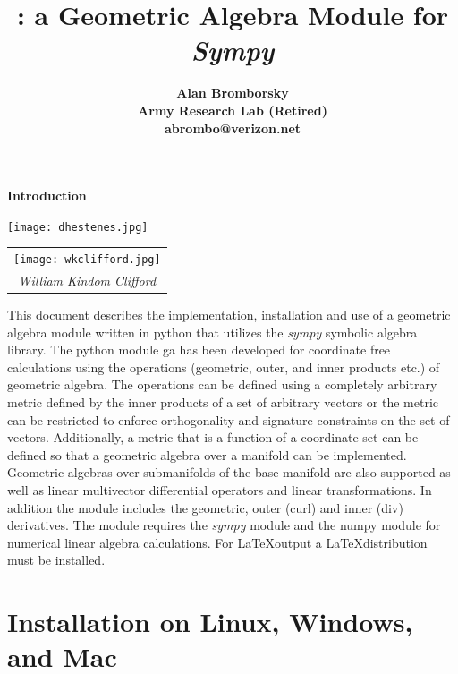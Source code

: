 \documentclass[12pt]{report}
\title{\galgebra: \bf\Large a Geometric Algebra Module for \emph{Sympy}}
\author{\bf Alan Bromborsky\\
\bf Army Research Lab (Retired)\\
\bf abrombo@verizon.net}
\begin{document}
\parskip 10pt

\maketitle
{\bf Introduction}\newline

\begin{center}
\texttt{[image: dhestenes.jpg]} \begin{tabular}{c}
\texttt{[image: wkclifford.jpg]} \\
\emph{William Kindom Clifford}
\end{tabular} 
\end{center}

   This document describes the implementation, installation and use of a
   geometric algebra module written in
   python that utilizes the \emph{sympy} symbolic algebra library.  The python
   module ga has been developed for coordinate free calculations using
   the operations (geometric, outer, and inner products etc.) of geometric algebra.
   The operations can be defined using a completely arbitrary metric defined
   by the inner products of a set of arbitrary vectors or the metric can be
   restricted to enforce orthogonality and signature constraints on the set of
   vectors.  Additionally, a metric that is a function of a coordinate set can
   be defined so that a geometric algebra over a manifold can be implemented.
   Geometric algebras over submanifolds of the base manifold are also supported as
   well as linear multivector differential operators and linear transformations.
   In addition the module includes the geometric, outer (curl) and inner
   (div) derivatives. The module requires the \emph{sympy} module and the numpy module for numerical linear
   algebra calculations.  For \LaTeX output a \LaTeX distribution must be installed.

\tableofcontents

\chapter{Installation on Linux, Windows, and Mac}
\end{document}
